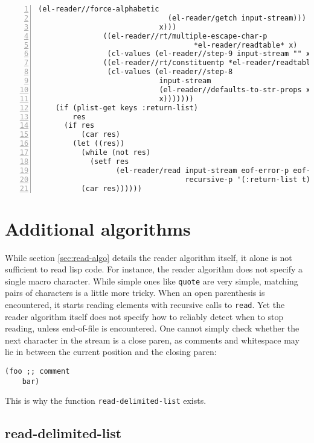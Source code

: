\documentclass[a4paper,10pt,twoside]{report}
\newcommand{\fun}[1]{\texttt{#1}}
\newcommand{\Read}{\fun{read}}
\begin{document}
\begin{lstlisting}[style=lispcode,label={code:read-algo},caption={Code for the
    reader algorithm.},numbers=left]
                             (el-reader//force-alphabetic
                              (el-reader/getch input-stream)))
                            x)))
               ((el-reader//rt/multiple-escape-char-p
                                    *el-reader/readtable* x)
                (cl-values (el-reader//step-9 input-stream "" x)))
               ((el-reader//rt/constituentp *el-reader/readtable* x)
                (cl-values (el-reader//step-8
                            input-stream
                            (el-reader//defaults-to-str-props x)
                            x)))))))
    (if (plist-get keys :return-list)
        res
      (if res
          (car res)
        (let ((res))
          (while (not res)
            (setf res
                  (el-reader/read input-stream eof-error-p eof-value
                                  recursive-p '(:return-list t))))
          (car res))))))
\end{lstlisting}


\section{Additional algorithms}
\label{sec:add-algos}

While section \ref{sec:read-algo} details the reader algorithm itself, it alone
is not sufficient to read lisp code.  For instance, the reader algorithm does
not specify a single macro character.  While simple ones like \fun{quote} are
very simple, matching pairs of characters is a little more tricky.  When an open
parenthesis is encountered, it starts reading elements with recursive calls to
\Read{}.  Yet the reader algorithm itself does not specify how to reliably
detect when to stop reading, unless end-of-file is encountered.  One cannot
simply check whether the next character in the stream is a close paren, as
comments and whitespace may lie in between the current position and the closing
paren:

\begin{lstlisting}[style=lispinline]
  (foo ;; comment
    bar)
\end{lstlisting}

This is why the function \fun{read-delimited-list} exists.

\subsection{read-delimited-list}
\label{subsec:read-delimited-list}
\end{document}
